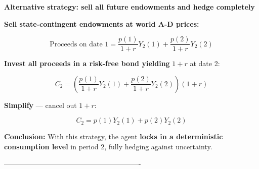 \documentclass[12pt]{article}
\begin{document}
\vspace{.5cm}
{\color{blue}
\textbf{Alternative strategy: sell all future endowments and hedge completely}

\textbf{Sell state-contingent endowments at world A-D prices:}

\[
\text{Proceeds on date 1} = \frac{p(1)}{1 + r} Y_2(1) + \frac{p(2)}{1 + r} Y_2(2)
\]

\textbf{Invest all proceeds in a risk-free bond yielding} \( 1 + r \) at date 2:

\[
C_2 = \left( \frac{p(1)}{1 + r} Y_2(1) + \frac{p(2)}{1 + r} Y_2(2) \right) (1 + r)
\]

\textbf{Simplify} — cancel out \( 1 + r \):

\[
C_2 = p(1)Y_2(1) + p(2)Y_2(2)
\]

\textbf{Conclusion:}  
With this strategy, the agent \textbf{locks in a deterministic consumption level} in period 2, fully hedging against uncertainty.

}
----------------------------------------------------------
\end{document}
